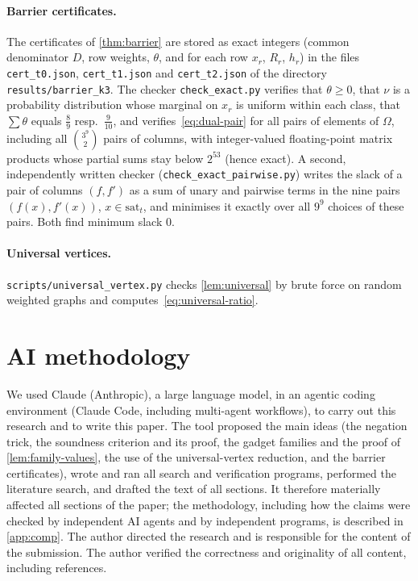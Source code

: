 \documentclass[11pt,letterpaper]{article}
\theoremstyle{remark}
\newcommand{\sat}{\mathrm{sat}}
\begin{document}
\paragraph{Barrier certificates.} The certificates of \cref{thm:barrier} are stored as exact integers
(common denominator $D$, row weights, $\theta$, and for each row $x_r$, $R_r$, $h_r$) in the files
\texttt{cert\_t0.json}, \texttt{cert\_t1.json} and \texttt{cert\_t2.json} of the directory
\texttt{results/barrier\_k3}. The checker \texttt{check\_exact.py} verifies that
$\theta\ge0$, that $\nu$ is a probability distribution whose marginal on $x_r$ is uniform within each class,
that $\sum\theta$ equals $\frac89$ resp.\ $\frac9{10}$, and verifies~\eqref{eq:dual-pair} for all pairs of
elements of $\Omega$, including all $\binom{3^9}{2}$ pairs of columns, with integer-valued floating-point
matrix products whose partial sums stay below $2^{53}$ (hence exact). A second, independently written
checker (\texttt{check\_exact\_pairwise.py}) writes the slack of a pair of columns $(f,f')$ as a sum of
unary and pairwise terms in the nine pairs $(f(x),f'(x))$, $x\in\sat_t$, and minimises it exactly over
all $9^9$ choices of these pairs. Both find
minimum slack $0$.

\paragraph{Universal vertices.} \texttt{scripts/universal\_vertex.py} checks \cref{lem:universal} by brute
force on random weighted graphs and computes~\eqref{eq:universal-ratio}.

\section*{AI methodology}
We used Claude (Anthropic), a large language model, in an agentic coding environment (Claude Code,
including multi-agent workflows), to carry out this research and to write this paper. The tool proposed
the main ideas (the negation trick, the soundness criterion and its proof, the gadget families and the
proof of \cref{lem:family-values}, the use of the universal-vertex reduction, and the barrier
certificates), wrote and ran all search and verification programs, performed the literature search, and
drafted the text of all sections. It therefore materially affected all sections of the paper; the
methodology, including how the claims were checked by independent AI agents and by independent programs,
is described in \cref{app:comp}. The author directed the research and is responsible for the content of
the submission. The author verified the correctness and originality of all content, including references.



\end{document}
